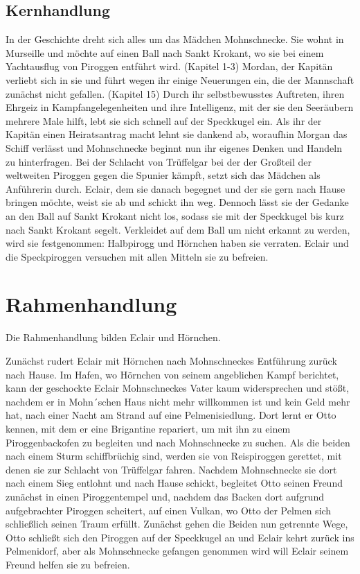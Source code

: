 \subsection{Kernhandlung}
In der Geschichte dreht sich alles um das Mädchen Mohnschnecke. Sie wohnt in Murseille und möchte auf einen Ball nach Sankt Krokant, wo sie bei einem Yachtausflug von Piroggen entführt wird. (Kapitel 1-3) Mordan, der Kapitän verliebt sich in sie und führt wegen ihr einige Neuerungen ein, die der Mannschaft zunächst nicht gefallen. (Kapitel 15) Durch ihr selbstbewusstes Auftreten, ihren Ehrgeiz in Kampfangelegenheiten und ihre Intelligenz, mit der sie den Seeräubern mehrere Male hilft, lebt sie sich schnell auf der Speckkugel ein. Als ihr der Kapitän einen Heiratsantrag macht lehnt sie dankend ab, woraufhin Morgan das Schiff verlässt und Mohnschnecke beginnt nun ihr eigenes Denken und Handeln zu hinterfragen. Bei der Schlacht von Trüffelgar bei der der Großteil der weltweiten Piroggen gegen die Spunier kämpft, setzt sich das Mädchen als Anführerin durch. Eclair, dem sie danach begegnet und der sie gern nach Hause bringen möchte, weist sie ab und schickt ihn weg. Dennoch lässt sie der Gedanke an den Ball auf Sankt Krokant nicht los, sodass sie mit der Speckkugel bis kurz nach Sankt Krokant segelt. Verkleidet auf dem Ball um nicht erkannt zu werden, wird sie festgenommen: Halbpirogg und Hörnchen haben sie verraten. Eclair und die Speckpiroggen versuchen mit allen Mitteln sie zu befreien.

\section{Rahmenhandlung}

Die Rahmenhandlung bilden Eclair und Hörnchen.

Zunächst rudert Eclair mit Hörnchen nach Mohnschneckes Entführung zurück nach Hause. Im Hafen, wo Hörnchen von seinem angeblichen Kampf berichtet, kann der geschockte Eclair Mohnschneckes Vater kaum widersprechen und stößt, nachdem er in Mohn´schen Haus nicht mehr willkommen ist und kein Geld mehr hat, nach einer Nacht am Strand auf eine Pelmenisiedlung. Dort lernt er Otto kennen, mit dem er eine Brigantine repariert, um mit ihn zu einem Piroggenbackofen zu begleiten und nach Mohnschnecke zu suchen. Als die beiden nach einem Sturm schiffbrüchig sind, werden sie von Reispiroggen gerettet, mit denen sie zur Schlacht von Trüffelgar fahren. Nachdem Mohnschnecke sie dort nach einem Sieg entlohnt und nach Hause schickt, begleitet Otto seinen Freund zunächst in einen Piroggentempel und, nachdem das Backen dort aufgrund aufgebrachter Piroggen scheitert, auf einen Vulkan, wo Otto der Pelmen sich schließlich seinen Traum erfüllt. Zunächst gehen die Beiden nun getrennte Wege, Otto schließt sich den Piroggen auf der Speckkugel an und Eclair kehrt zurück ins Pelmenidorf, aber als Mohnschnecke gefangen genommen wird will Eclair seinem Freund helfen sie zu befreien.

